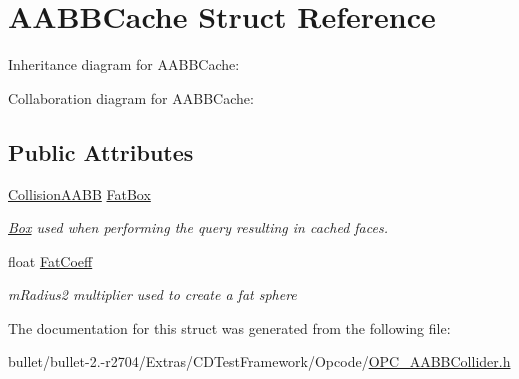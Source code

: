 \hypertarget{struct_a_a_b_b_cache}{\section{A\+A\+B\+B\+Cache Struct Reference}
\label{struct_a_a_b_b_cache}
}


Inheritance diagram for A\+A\+B\+B\+Cache\+:


Collaboration diagram for A\+A\+B\+B\+Cache\+:
\subsection*{Public Attributes}
\begin{DoxyCompactItemize}
\item 
\hypertarget{struct_a_a_b_b_cache_a739e3bc835cf651d3040bf615ec63996}{\hyperlink{class_collision_a_a_b_b}{Collision\+A\+A\+B\+B} \hyperlink{struct_a_a_b_b_cache_a739e3bc835cf651d3040bf615ec63996}{Fat\+Box}}\label{struct_a_a_b_b_cache_a739e3bc835cf651d3040bf615ec63996}

\begin{DoxyCompactList}\small\item\em \hyperlink{class_box}{Box} used when performing the query resulting in cached faces. \end{DoxyCompactList}\item 
\hypertarget{struct_a_a_b_b_cache_aa3e8dde6b0472dd391a2884cd0aa9efa}{float \hyperlink{struct_a_a_b_b_cache_aa3e8dde6b0472dd391a2884cd0aa9efa}{Fat\+Coeff}}\label{struct_a_a_b_b_cache_aa3e8dde6b0472dd391a2884cd0aa9efa}

\begin{DoxyCompactList}\small\item\em m\+Radius2 multiplier used to create a fat sphere \end{DoxyCompactList}\end{DoxyCompactItemize}


The documentation for this struct was generated from the following file\+:\begin{DoxyCompactItemize}
\item 
bullet/bullet-\/2.-\/r2704/\+Extras/\+C\+D\+Test\+Framework/\+Opcode/\hyperlink{_o_p_c___a_a_b_b_collider_8h}{O\+P\+C\+\_\+\+A\+A\+B\+B\+Collider.\+h}\end{DoxyCompactItemize}
